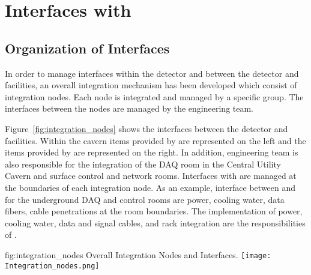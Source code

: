 \chapter{Interfaces with }
\label{vl:tc-lbnf}

\section{Organization of Interfaces}
\label{sec:inter-org-interf}
In order to manage interfaces within the detector and between the
detector and facilities, an overall integration mechanism has been
developed which consist of integration nodes. Each node is integrated
and managed by a specific group. The interfaces between the nodes are
managed by the  engineering team.

Figure~\ref{fig:integration_nodes} shows the interfaces between the
detector and facilities. Within the cavern items provided by  are
represented on the left and the items provided by  are represented
on the right. In addition,  engineering team is also
responsible for the integration of the DAQ room in the Central Utility
Cavern and surface control and network rooms. Interfaces with  are
managed at the boundaries of each integration node. As an example,
interface between  and  for the underground DAQ and control
rooms are power, cooling water, data fibers, cable penetrations at the
room boundaries. The implementation of power, cooling water, data and
signal cables, and rack integration are the responsibilities of .
\begin{dunefigure}{fig:integration_nodes}
  {Overall Integration Nodes and Interfaces.}
  \texttt{[image: Integration\_nodes.png]}
\end{dunefigure}


